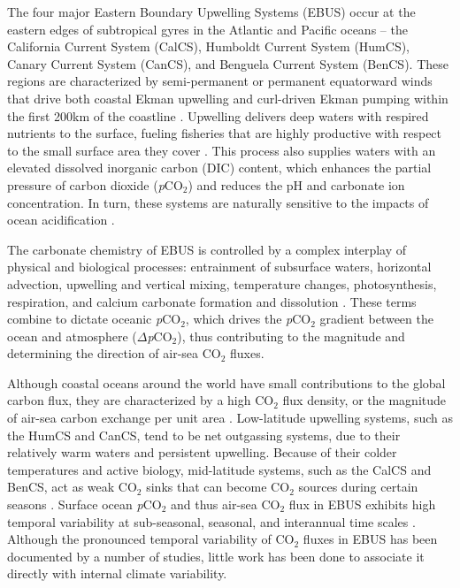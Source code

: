\documentclass[hvmath, online,bgd]{copernicus_discussions}
\begin{document}
\introduction[Introduction]  %
The four major Eastern Boundary Upwelling Systems (EBUS) occur at the eastern edges of subtropical gyres in the Atlantic and Pacific oceans -- the California Current System (CalCS), Humboldt Current System (HumCS), Canary Current System (CanCS), and Benguela Current System (BenCS). These regions are characterized by semi-permanent or permanent equatorward winds that drive both coastal Ekman upwelling and curl-driven Ekman pumping within the first 200km of the coastline \citep{Chavez:2009}. Upwelling delivers deep waters with respired nutrients to the surface, fueling fisheries that are highly productive with respect to the small surface area they cover \citep{Ryther:1969}. This process also supplies waters with an elevated dissolved inorganic carbon (DIC) content, which enhances the partial pressure of carbon dioxide (\textit{p}CO$_{2}$) and reduces the pH and carbonate ion concentration. In turn, these systems are naturally sensitive to the impacts of ocean acidification \citep{Hauri:2009,Bakun:2015,Chan:2017}. 

The carbonate chemistry of EBUS is controlled by a complex interplay of physical and biological processes: entrainment of subsurface waters, horizontal advection, upwelling and vertical mixing, temperature changes, photosynthesis, respiration, and calcium carbonate formation and dissolution \citep{DeGrandpre:1998, King:2007}. These terms combine to dictate oceanic \textit{p}CO$_{2}$, which drives the \textit{p}CO$_{2}$ gradient between the ocean and atmosphere ($\Delta$\textit{p}CO$_{2}$), thus contributing to the magnitude and determining the direction of air-sea CO$_{2}$ fluxes. 

Although coastal oceans around the world have small contributions to the global carbon flux, they are characterized by a high CO$_{2}$ flux density, or the magnitude of air-sea carbon exchange per unit area \citep{Laruelle:2010,Laruelle:2014,Gruber:2015}. Low-latitude upwelling systems, such as the HumCS and CanCS, tend to be net outgassing systems, due to their relatively warm waters and persistent upwelling. Because of their colder temperatures and active biology, mid-latitude systems, such as the CalCS and BenCS, act as weak CO$_{2}$ sinks that can become CO$_{2}$ sources during certain seasons \citep{Borges:2002,Hales:2005,Cai:2006,Gregor:2013}. Surface ocean \textit{p}CO$_{2}$ and thus air-sea CO$_2$ flux in EBUS exhibits high temporal variability at sub-seasonal, seasonal, and interannual time scales \citep{Friederich:2002,Gonzales:2009,Leinweber:2009, Evans:2011,Turi:2014}. Although the pronounced temporal variability of CO$_{2}$ fluxes in EBUS has been documented by a number of studies, little work has been done to associate it directly with internal climate variability. 
\end{document}
